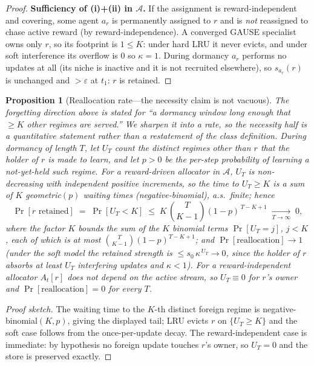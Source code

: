 \documentclass[11pt,a4paper]{article}
\theoremstyle{definition}
\theoremstyle{plain}
\newtheorem{proposition}{Proposition}[section]
\begin{document}
\begin{proof}
\textbf{Sufficiency of (i)+(ii) in $\mathcal{A}$.} If the assignment is
reward-independent and covering, some agent $a_r$ is permanently assigned to $r$
and is \emph{not} reassigned to chase active reward (by reward-independence). A
converged GAUSE specialist owns only $r$, so its footprint is $1 \le K$: under
hard LRU it never evicts, and under soft interference its overflow is $0$ so
$\kappa = 1$. During dormancy $a_r$ performs no updates at all (its niche is
inactive and it is not recruited elsewhere), so $s_{a_r}(r)$ is unchanged and
$> \varepsilon$ at $t_1$: $r$ is retained.
\end{proof}

\begin{proposition}[Reallocation rate---the necessity claim is not vacuous]
\label{prop:realloc_rate}
The forgetting direction above is stated for ``a dormancy window long enough that
$\ge K$ other regimes are served.'' We sharpen it into a rate, so the necessity
half is a quantitative statement rather than a restatement of the class definition.
During dormancy of length $T$, let $U_T$ count the distinct regimes other than $r$
that the holder of $r$ is made to learn, and let $p>0$ be the per-step probability
of learning a not-yet-held such regime. For a reward-driven allocator in
$\mathcal{A}$, $U_T$ is non-decreasing with independent positive increments, so the
time to $U_T\ge K$ is a sum of $K$ geometric$(p)$ waiting times (negative-binomial),
a.s.\ finite; hence
\[
  \Pr[r\text{ retained}] \;=\; \Pr[U_T<K]
  \;\le\; K\,\binom{T}{K-1}(1-p)^{\,T-K+1} \;\xrightarrow[T\to\infty]{}\; 0,
\]
where the factor $K$ bounds the sum of the $K$ binomial terms $\Pr[U_T=j]$,
$j<K$, each of which is at most $\binom{T}{K-1}(1-p)^{T-K+1}$; and
$\Pr[\text{reallocation}]\to 1$ (under the soft model the retained strength is
$\le s_0\,\kappa^{\,U_T}\to0$, since the holder of $r$ absorbs at least $U_T$
interfering updates and $\kappa<1$). For a reward-independent allocator $A_t[r]$ does not
depend on the active stream, so $U_T\equiv 0$ for $r$'s owner and
$\Pr[\text{reallocation}]=0$ for every $T$.
\end{proposition}

\begin{proof}[Proof sketch]
The waiting time to the $K$-th distinct foreign regime is negative-binomial$(K,p)$,
giving the displayed tail; LRU evicts $r$ on $\{U_T\ge K\}$ and the soft case follows
from the once-per-update decay. The reward-independent case is immediate: by
hypothesis no foreign update touches $r$'s owner, so $U_T=0$ and the store is
preserved exactly. \end{proof}
\end{document}
